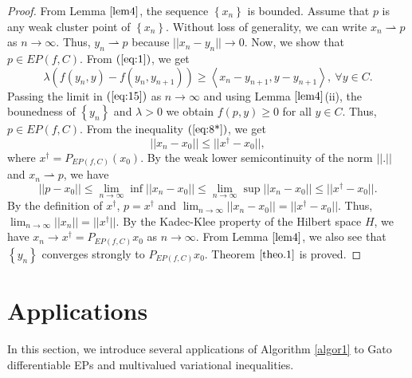 \documentclass{aims}
\theoremstyle{definition}
\begin{document}
\begin{proof}
From Lemma $\ref{lem4}$, the sequence $\left\{x_n\right\}$ is bounded. Assume that $p$ is any weak cluster point of $\left\{x_n\right\}$. 
Without loss of generality, we can write $x_n\rightharpoonup p$ as $n\to \infty$. Thus, $y_n\rightharpoonup p$ because $||x_n-y_n||\to 0$. 
Now, we show that $p\in EP(f,C)$.  
From $(\ref{eq:1})$, we get 
\begin{equation}\label{eq:15}
\lambda\left(f(y_n,y)-f(y_n,y_{n+1})\right)\ge \left\langle x_n-y_{n+1},y-y_{n+1}\right\rangle,~\forall y\in C.
\end{equation}
Passing the limit in $(\ref{eq:15})$ as $n\to\infty$ and using Lemma $\ref{lem4}$(ii), the bounedness of $\left\{y_n\right\}$ 
and $\lambda>0$ we obtain $f(p,y)\ge 0$ for all $y\in C$. Thus, $p\in EP(f,C)$. From the inequality $(\ref{eq:8*})$, we get
$$ ||x_n-x_0||\le ||x^\dagger-x_0||,$$
where $x^\dagger=P_{EP(f,C)}(x_0)$. By the weak lower semicontinuity of the norm $||.||$ and $x_n\rightharpoonup p$, we have
\begin{equation*}
||p-x_0||\le \lim_{n\to\infty}\inf||x_{n}-x_0||\le \lim_{n\to\infty}\sup||x_{n}-x_0||\le||x^\dagger-x_0||.
\end{equation*}
By the definition of $x^\dagger$, $p=x^\dagger$ and $\lim_{n\to\infty}||x_{n}-x_0||=||x^\dagger-x_0||$. Thus, $\lim_{n\to\infty}||x_{n}||=||x^\dagger||$. 
By the Kadec-Klee property of the Hilbert space $H$, we have $x_{n}\to x^\dagger=P_{EP(f,C)}x_0$ as $n\to\infty$. From Lemma $\ref{lem4}$, we 
also see that $\left\{y_n\right\}$ converges strongly to $P_{EP(f,C)}x_0$. Theorem $\ref{theo.1}$ is proved.
\end{proof}
\section{Applications}\label{Appl}
In this section, we introduce several applications of Algorithm \ref{algor1} to Gato differentiable EPs and multivalued variational inequalities.
\end{document}
